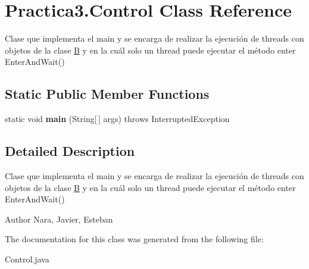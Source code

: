 \hypertarget{class_practica3_1_1_control}{}\section{Practica3.\+Control Class Reference}
\label{class_practica3_1_1_control}


Clase que implementa el main y se encarga de realizar la ejecución de threads con objetos de la clase \hyperlink{class_practica3_1_1_b}{B} y en la cuál solo un thread puede ejecutar el método enter Enter\+And\+Wait()  


\subsection*{Static Public Member Functions}
\begin{DoxyCompactItemize}
\item 
\hypertarget{class_practica3_1_1_control_a902225128c6668c45c8b5eacd0ab21c5}{}static void {\bfseries main} (String\mbox{[}$\,$\mbox{]} args)  throws Interrupted\+Exception\label{class_practica3_1_1_control_a902225128c6668c45c8b5eacd0ab21c5}

\end{DoxyCompactItemize}


\subsection{Detailed Description}
Clase que implementa el main y se encarga de realizar la ejecución de threads con objetos de la clase \hyperlink{class_practica3_1_1_b}{B} y en la cuál solo un thread puede ejecutar el método enter Enter\+And\+Wait() 

\begin{DoxyAuthor}{Author}
Nara, Javier, Esteban 
\end{DoxyAuthor}


The documentation for this class was generated from the following file\+:\begin{DoxyCompactItemize}
\item 
Control.\+java\end{DoxyCompactItemize}
